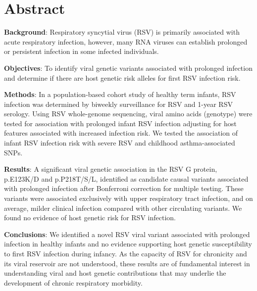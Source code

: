 \documentclass{article} %
\begin{document}
\clearpage
\section{Abstract}
\textbf{Background}: Respiratory syncytial virus (RSV) is primarily associated with acute respiratory infection, however, many RNA viruses can establish prolonged or persistent infection in some infected individuals.

\textbf{Objectives}: To identify viral genetic variants associated with prolonged infection and determine if there are host genetic risk alleles for first RSV infection risk.

\textbf{Methods}: In a population-based cohort study of healthy term infants, RSV infection was determined by biweekly surveillance for RSV and 1-year RSV serology. Using RSV whole-genome sequencing, viral amino acids (genotype) were tested for association with 
prolonged infant RSV infection adjusting for host features associated with increased infection risk. We tested the association of infant RSV infection risk with severe RSV and childhood asthma-associated SNPs.

\textbf{Results}: A significant viral genetic association in the RSV G protein, p.E123K/D and p.P218T/S/L, identified as candidate causal variants associated with prolonged infection after Bonferroni correction for multiple testing. These variants were associated exclusively with upper respiratory tract infection, and on average, milder clinical infection compared with other circulating variants. We found no evidence of host genetic risk for RSV infection.

\textbf{Conclusions}: We identified a novel RSV viral variant associated with prolonged infection in healthy infants and no evidence supporting host genetic susceptibility to first RSV infection during infancy. As the capacity of RSV for chronicity and its viral reservoir are not understood, these results are of fundamental interest in understanding viral and host genetic contributions that may underlie the development of chronic respiratory morbidity.
\end{document}
